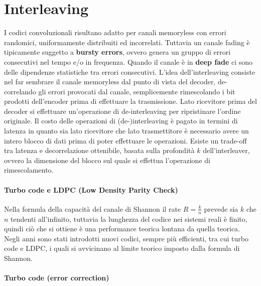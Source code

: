 \section*{Interleaving}

I codici convoluzionali risultano adatto per canali memoryless con errori randomici, uniformamente distribuiti ed incorrelati. 
Tuttavia un canale fading è tipicamente suggetto a \textbf{bursty errors}, ovvero genera un gruppo di errori consecutivi nel tempo e/o in frequenza. 
Quando il canale è in \textbf{deep fade} ci sono delle dipendenze statistiche tra errori consecutivi.
L'idea dell'interleaving consiste nel far sembrare il canale memoryless dal punto di vista del decoder, de-correlando gli errori provocati dal canale, semplicemente rimescolando i bit prodotti dell'encoder prima di effettuare la trasmissione.
Lato ricevitore prima del decoder si effettuare un'operazione di de-interleaving per ripristinare l'ordine originale.
Il costo delle operazioni di (de-)interleaving è pagato in termini di latenza in quanto sia lato ricevitore che lato trasmettitore è necessario avere un intero blocco di dati prima di poter effettuare le operazioni. 
Esiste un trade-off tra latenza e decorrelazione ottenibile, basata sulla profondità $k$ dell'interleaver, ovvero la dimensione del blocco sul quale si effettua l'operazione di rimescolamento.


\paragraph*{Turbo code e LDPC (Low Density Parity Check)}
Nella formula della capacità del canale di Shannon il rate $R = \frac{k}{n}$ prevede sia $k$ che $n$ tendenti all'infinito, tuttavia la lunghezza del codice nei sistemi reali è finito, quindi ciò che si ottiene è una performance teorica lontana da quella teorica.
Negli anni sono stati introdotti nuovi codici, sempre più efficienti, tra cui turbo code e LDPC, i quali si avvicinano al limite teorico imposto dalla formula di Shannon.

\paragraph*{Turbo code (error correction)}

